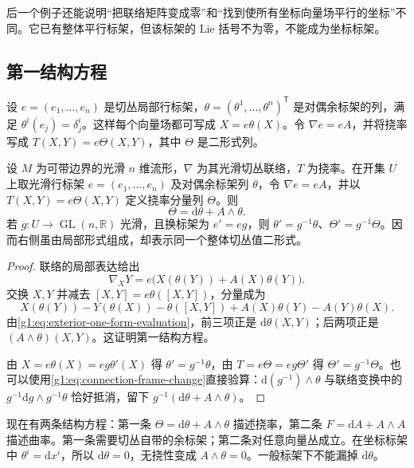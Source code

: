 后一个例子还能说明“把联络矩阵变成零”和“找到使所有坐标向量场平行的坐标”不同。它已有整体平行标架，但该标架的 Lie 括号不为零，不能成为坐标标架。

\subsection{第一结构方程}
\label{g1:subsec:1504:03}

设 \(e=(e_1,\ldots,e_n)\) 是切丛局部行标架，\(\theta=(\theta^1,\ldots,\theta^n)^{\mathsf T}\) 是对偶余标架的列，满足 \(\theta^i(e_j)=\delta^i_j\)。这样每个向量场都可写成 \(X=e\theta(X)\)。令 \(\nabla e=eA\)，并将挠率写成 \(T(X,Y)=e\Theta(X,Y)\)，其中 \(\Theta\) 是二形式列。

\begin{proposition}[第一结构方程]\label{g1:prop:first-structure-equation}
	设 \(M\) 为可带边界的光滑 \(n\) 维流形，\(\nabla\) 为其光滑切丛联络，\(T\) 为挠率。在开集 \(U\) 上取光滑行标架 \(e=(e_1,\ldots,e_n)\) 及对偶余标架列 \(\theta\)，令 \(\nabla e=eA\)，并以 \(T(X,Y)=e\Theta(X,Y)\) 定义挠率分量列 \(\Theta\)。则
	\begin{equation}\label{g1:eq:first-structure-equation}
		\Theta=\mathrm{d}\theta+A\wedge\theta.
	\end{equation}
	若 \(g:U\to\operatorname{GL}(n,\mathbb R)\) 光滑，且换标架为 \(e'=eg\)，则 \(\theta'=g^{-1}\theta\)、\(\Theta'=g^{-1}\Theta\)。因而右侧虽由局部形式组成，却表示同一个整体切丛值二形式。
\end{proposition}
\begin{proof}
	联络的局部表达给出
	\[
		\nabla_XY=e\bigl(X(\theta(Y))+A(X)\theta(Y)\bigr).
	\]
	交换 \(X,Y\) 并减去 \([X,Y]=e\theta([X,Y])\)，分量成为
	\[
		X(\theta(Y))-Y(\theta(X))-\theta([X,Y])
		+A(X)\theta(Y)-A(Y)\theta(X).
	\]
	由\eqref{g1:eq:exterior-one-form-evaluation}，前三项正是 \(\mathrm{d}\theta(X,Y)\)；后两项正是 \((A\wedge\theta)(X,Y)\)。这证明第一结构方程。

	由 \(X=e\theta(X)=eg\theta'(X)\) 得 \(\theta'=g^{-1}\theta\)，由 \(T=e\Theta=eg\Theta'\) 得 \(\Theta'=g^{-1}\Theta\)。也可以使用\eqref{g1:eq:connection-frame-change}直接验算：\(\mathrm{d}(g^{-1})\wedge\theta\) 与联络变换中的 \(g^{-1}\mathrm{d}g\wedge g^{-1}\theta\) 恰好抵消，留下 \(g^{-1}(\mathrm{d}\theta+A\wedge\theta)\)。
\end{proof}

现在有两条结构方程：第一条 \(\Theta=\mathrm{d}\theta+A\wedge\theta\) 描述挠率，第二条 \(F=\mathrm{d}A+A\wedge A\) 描述曲率。第一条需要切丛自带的余标架；第二条对任意向量丛成立。在坐标标架中 \(\theta^i=\mathrm{d}x^i\)，所以 \(\mathrm{d}\theta=0\)，无挠性变成 \(A\wedge\theta=0\)。一般标架下不能漏掉 \(\mathrm{d}\theta\)。


